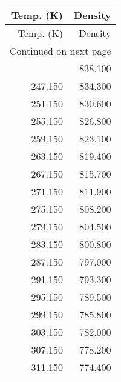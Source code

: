 \begin{longtable}{rr}
\toprule
 Temp. (K) &  Density \\
\midrule
\endfirsthead

\toprule
 Temp. (K) &  Density \\
\midrule
\endhead
\midrule
\multicolumn{2}{r}{{Continued on next page}} \\
\midrule
\endfoot

\bottomrule
\endlastfoot
   243.150 &  838.100 \\
   247.150 &  834.300 \\
   251.150 &  830.600 \\
   255.150 &  826.800 \\
   259.150 &  823.100 \\
   263.150 &  819.400 \\
   267.150 &  815.700 \\
   271.150 &  811.900 \\
   275.150 &  808.200 \\
   279.150 &  804.500 \\
   283.150 &  800.800 \\
   287.150 &  797.000 \\
   291.150 &  793.300 \\
   295.150 &  789.500 \\
   299.150 &  785.800 \\
   303.150 &  782.000 \\
   307.150 &  778.200 \\
   311.150 &  774.400 \\
\end{longtable}

